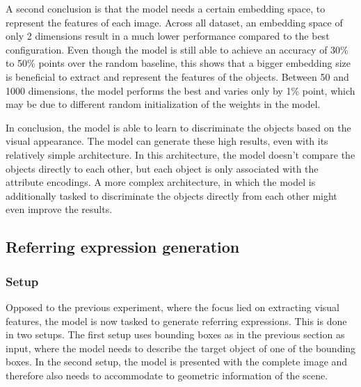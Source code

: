 A second conclusion is that the model needs a certain embedding space, to represent the features of each image.
Across all dataset, an embedding space of only 2 dimensions result in a much lower performance compared to the best configuration.
Even though the model is still able to achieve an accuracy of 30\% to 50\% points over the random baseline, this shows that a bigger embedding size is beneficial to extract and represent the features of the objects.
Between 50 and 1000 dimensions, the model performs the best and varies only by 1\% point, which may be due to different random initialization of the weights in the model.

In conclusion, the model is able to learn to discriminate the objects based on the visual appearance.
The model can generate these high results, even with its relatively simple architecture.
In this architecture, the model doesn't compare the objects directly to each other, but each object is only associated with the attribute encodings.
A more complex architecture, in which the model is additionally tasked to discriminate the objects directly from each other might even improve the results.

\subsection{Referring expression generation}
\label{sec:referring_expression_generation}
\subsubsection*{Setup}

Opposed to the previous experiment, where the focus lied on extracting visual features, the model is now tasked to generate referring expressions.
This is done in two setups.
The first setup uses bounding boxes as in the previous section as input, where the model needs to describe the target object of one of the bounding boxes.
In the second setup, the model is presented with the complete image and therefore also needs to accommodate to geometric information of the scene.

